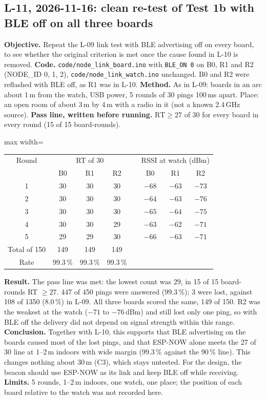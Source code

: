 \IfFileExists{IEEEtran.cls}{\documentclass[conference]{IEEEtran}}{\documentclass[10pt,twocolumn]{article}}
\newcommand{\fitcol}[1]{\begin{adjustbox}{max width=\columnwidth}#1\end{adjustbox}}
\begin{document}
\subsection*{L-11, 2026-11-16: clean re-test of Test 1b with BLE off on all three boards}
\textbf{Objective.} Repeat the L-09 link test with BLE advertising off on every board, to see whether the original criterion is met once the cause found in L-10 is removed. \textbf{Code.} \texttt{code/node\_link\_board.ino} with \texttt{BLE\_ON 0} on B0, R1 and R2 (NODE\_ID 0, 1, 2), \texttt{code/node\_link\_watch.ino} unchanged. B0 and R2 were reflashed with BLE off, as R1 was in L-10. \textbf{Method.} As in L-09: boards in an arc about 1\,m from the watch, USB power, 5 rounds of 30 pings 100\,ms apart. Place: an open room of about 3\,m by 4\,m with a radio in it (not a known 2.4\,GHz source). \textbf{Pass line, written before running.} $\mathrm{RT}\ge 27$ of 30 for every board in every round (15 of 15 board-rounds).

\begin{center}\footnotesize\setlength{\tabcolsep}{4pt}
\fitcol{\begin{tabular}{@{}c ccc c ccc@{}}
\toprule
Round & \multicolumn{3}{c}{RT of 30} & & \multicolumn{3}{c}{RSSI at watch (dBm)}\\
 & B0 & R1 & R2 & & B0 & R1 & R2\\
\midrule
1 & 30 & 30 & 30 & & $-68$ & $-63$ & $-73$\\
2 & 30 & 30 & 30 & & $-64$ & $-63$ & $-76$\\
3 & 30 & 30 & 30 & & $-65$ & $-64$ & $-75$\\
4 & 30 & 30 & 29 & & $-63$ & $-62$ & $-71$\\
5 & 29 & 29 & 30 & & $-66$ & $-63$ & $-71$\\
\midrule
Total of 150 & 149 & 149 & 149 & & & & \\
Rate & 99.3\,\% & 99.3\,\% & 99.3\,\% & & & & \\
\bottomrule
\end{tabular}}
\end{center}
\textbf{Result.} The pass line was met: the lowest count was 29, in 15 of 15 board-rounds RT $\ge 27$. 447 of 450 pings were answered (99.3\,\%); 3 were lost, against 108 of 1350 (8.0\,\%) in L-09. All three boards scored the same, 149 of 150. R2 was the weakest at the watch ($-71$ to $-76$\,dBm) and still lost only one ping, so with BLE off the delivery did not depend on signal strength within this range. \textbf{Conclusion.} Together with L-10, this supports that BLE advertising on the boards caused most of the lost pings, and that ESP-NOW alone meets the 27 of 30 line at 1--2\,m indoors with wide margin (99.3\,\% against the 90\,\% line). This changes nothing about 30\,m (C3), which stays untested. For the design, the beacon should use ESP-NOW as its link and keep BLE off while receiving. \textbf{Limits.} 5 rounds, 1--2\,m indoors, one watch, one place; the position of each board relative to the watch was not recorded here.
\end{document}
